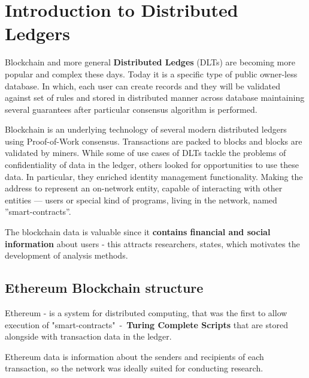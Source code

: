 \Introduction

\section{Introduction to Distributed Ledgers}
Blockchain and more general \textbf{Distributed Ledges} (DLTs) are becoming more popular and complex these days. Today it is a specific type of public owner-less database. In which, each user can create records and they will be validated against set of rules and stored in distributed manner across database maintaining several guarantees after particular consensus algorithm is performed.

Blockchain is an underlying technology of several modern distributed ledgers using Proof-of-Work consensus. Transactions are packed to blocks and blocks are validated by miners. While some of use cases of DLTs tackle the problems of confidentiality of data in the ledger, others looked for opportunities to use these data. In particular, they enriched identity management functionality. Making the address to represent an on-network entity, capable of interacting with other entities — users or special kind of programs, living in the network, named ”smart-contracts”.

The blockchain data is valuable since it \textbf{contains financial and social information} about users - this attracts researchers, states, which motivates the development of analysis methods.

\subsection{Ethereum Blockchain structure}
Ethereum - is a system for distributed computing, that was the first to allow execution of "smart-contracts"\ -\ \textbf{Turing Complete Scripts} that are stored alongside with transaction data in the ledger. 

Ethereum data\cite{will_price_2019} is information about the senders and recipients of each transaction, so the network was ideally suited for conducting research. %
\\

